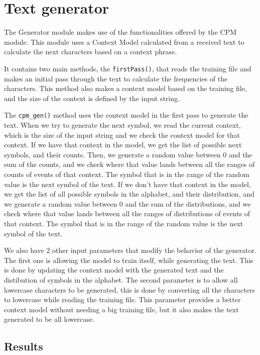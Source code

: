 \documentclass{article}
\begin{document}
\section{Text generator}
\label{sec:text-generator}

The Generator module makes use of the functionalities offered by the CPM module.
This module uses a Context Model calculated from a received text to calculate the
next characters based on a context phrase. 

It contains two main methods, the \verb|firstPass()|, that reads the training file and makes an initial pass through the text to calculate the frequencies of the characters.
This method also makes a context model based on the training file, and the size of the context is defined by the input string. 

The \verb|cpm_gen()| method uses the context model in the first pass to generate the text.
When we try to generate the next symbol, we read the current context, which is the size of the input string and we check the context model for that context. If we have that context in the model, we get the list of possible next symbols, and their counts. Then, we generate a random value between 0 and the sum of the counts, and we check where that value lands between all the ranges of counts of events of that context. The symbol that is in the range of the random value is the next symbol of the text.
If we don't have that context in the model, we get the list of all possible symbols in the alphabet, and their distribution, and we generate a random value between 0 and the sum of the distributions, and we check where that value lands between all the ranges of distributions of events of that context. The symbol that is in the range of the random value is the next symbol of the text. 

We also have 2 other input parameters that modify the behavior of the generator. The first one is allowing the model to train itself, while generating the text. This is done by updating the context model with the generated text and the distibution of symbols in the alphabet.
The second parameter is to allow all lowercase characters to be generated, this is done by converting all the characters to lowercase while reading the training file. This parameter provides a better context model without needing a big training file, but it also makes the text generated to be all lowercase.


\subsection{Results}
\end{document}
